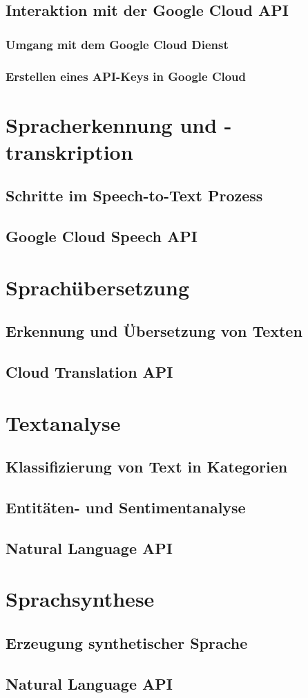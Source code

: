 \documentclass[12pt,a4paper]{article}
\begin{document}
\subsection{Interaktion mit der Google Cloud API}
\subsubsection{Umgang mit dem Google Cloud Dienst}	
\subsubsection{Erstellen eines API-Keys in Google Cloud}




\newpage
\section{Spracherkennung und -transkription}
\subsection{Schritte im Speech-to-Text Prozess}
\subsection{Google Cloud Speech API}


\newpage

\section{Sprachübersetzung}
\subsection{Erkennung und Übersetzung von Texten}
\subsection{Cloud Translation API}

\newpage

\section{Textanalyse}
\subsection{Klassifizierung von Text in Kategorien}
\subsection{Entitäten- und Sentimentanalyse}
\subsection{Natural Language API}

\newpage

\section{Sprachsynthese}
\subsection{Erzeugung synthetischer Sprache}
\subsection{Natural Language API}

\newpage
\thispagestyle{empty}
\printbibliography
\end{document}
